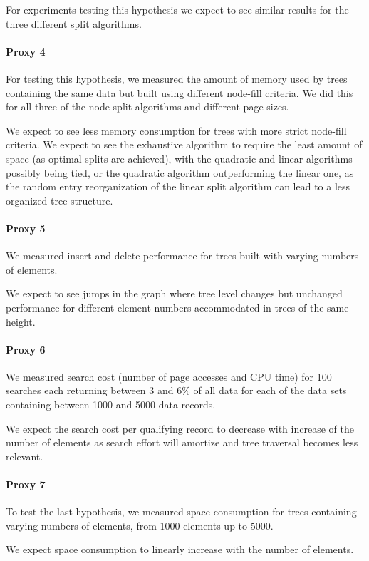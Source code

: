 For experiments testing this hypothesis we expect to see similar results for the three different split algorithms. 

\paragraph{Proxy 4}
For testing this hypothesis, we measured the amount of memory used by trees containing the same data but built using different node-fill criteria. We did this for all three of the node split algorithms and different page sizes.

We expect to see less memory consumption for trees with more strict node-fill criteria. We expect to see the exhaustive algorithm to require the least amount of space (as optimal splits are achieved), with the quadratic and linear algorithms possibly being tied, or the quadratic algorithm outperforming the linear one, as the random entry reorganization of the linear split algorithm can lead to a less organized tree structure. 

\paragraph{Proxy 5}
We measured insert and delete performance for trees built with varying numbers of elements. 

We expect to see jumps in the graph where tree level changes but unchanged performance for different element numbers accommodated in trees of the same height.

\paragraph{Proxy 6}
We measured search cost (number of page accesses and CPU time) for 100 searches each returning between 3 and 6\% of all data for each of the data sets containing between 1000 and 5000 data records.

We expect the search cost per qualifying record to decrease with increase of the number of elements as search effort will amortize and tree traversal becomes less relevant.

\paragraph{Proxy 7}
To test the last hypothesis, we measured space consumption for trees containing varying numbers of elements, from 1000 elements up to 5000.

We expect space consumption to linearly increase with the number of elements.

